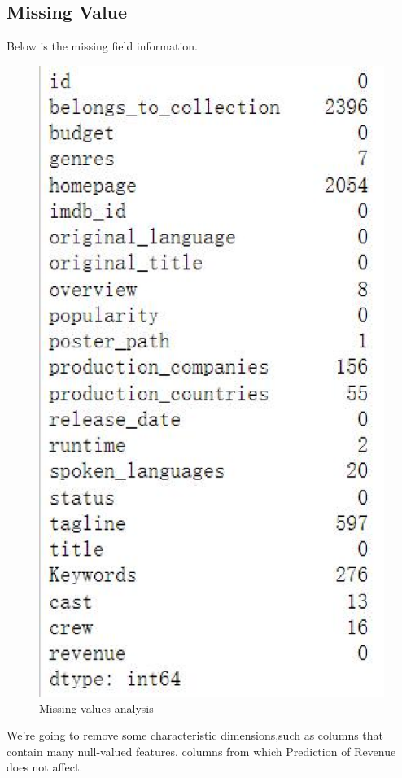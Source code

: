 \subsection{Missing Value} 
Below is the missing field information. \\
\begin{figure}[htbp]
  \includegraphics[scale=0.4]{./figures/MissingValue.eps}
  \caption{Missing values analysis}
\end{figure}
We're going to remove some characteristic dimensions,such as columns that contain many null-valued features,
columns from which Prediction of Revenue does not affect.



